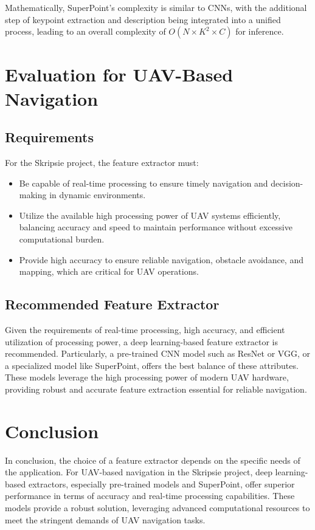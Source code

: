 Mathematically, SuperPoint's complexity is similar to CNNs, with the additional step of keypoint extraction and description being integrated into a unified process, leading to an overall complexity of $O(N \times K^2 \times C)$ for inference.

\section{Evaluation for UAV-Based Navigation}
\subsection{Requirements}
For the Skripsie project, the feature extractor must:
\begin{itemize}
    \item Be capable of real-time processing to ensure timely navigation and decision-making in dynamic environments.
    \item Utilize the available high processing power of UAV systems efficiently, balancing accuracy and speed to maintain performance without excessive computational burden.
    \item Provide high accuracy to ensure reliable navigation, obstacle avoidance, and mapping, which are critical for UAV operations.
\end{itemize}

\subsection{Recommended Feature Extractor}
Given the requirements of real-time processing, high accuracy, and efficient utilization of processing power, a deep learning-based feature extractor is recommended. Particularly, a pre-trained CNN model such as ResNet or VGG, or a specialized model like SuperPoint, offers the best balance of these attributes. These models leverage the high processing power of modern UAV hardware, providing robust and accurate feature extraction essential for reliable navigation.

\section{Conclusion}
In conclusion, the choice of a feature extractor depends on the specific needs of the application. For UAV-based navigation in the Skripsie project, deep learning-based extractors, especially pre-trained models and SuperPoint, offer superior performance in terms of accuracy and real-time processing capabilities. These models provide a robust solution, leveraging advanced computational resources to meet the stringent demands of UAV navigation tasks.






